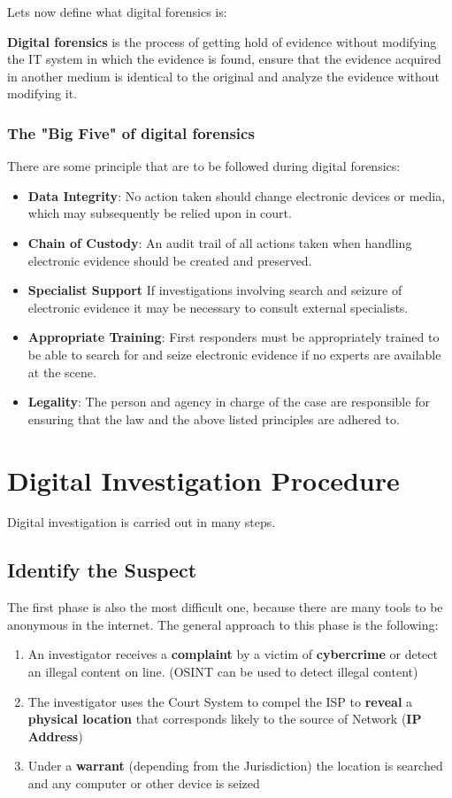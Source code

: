 Lets now define what digital forensics is:
\begin{boxH}
  \textbf{Digital forensics} is the process of getting hold of
  evidence without modifying the IT system in which the evidence is
  found, ensure that the evidence acquired in another medium is
  identical to the original and analyze the evidence without modifying 
  it.
\end{boxH}

\subsubsection{The "Big Five" of digital forensics}
There are some principle that are to be followed during digital
forensics:
\begin{itemize}
  \item \textbf{Data Integrity}: No action taken should change
    electronic devices or media, which may subsequently be relied upon
    in court. 
  \item \textbf{Chain of Custody}: An audit trail of all actions taken
    when handling electronic evidence should be created and preserved. 
  \item \textbf{Specialist Support} If investigations involving search
    and seizure of electronic evidence it may be necessary to consult
    external specialists. 
  \item \textbf{Appropriate Training}: First responders must be
    appropriately trained to be able to search for and seize
    electronic evidence if no experts are available at the scene. 
  \item \textbf{Legality}: The person and agency in charge of the case
    are responsible for ensuring that the law and the above listed
    principles are adhered to. 
\end{itemize}

\section{Digital Investigation Procedure}
Digital investigation is carried out in many steps.
\subsection{Identify the Suspect}
The first phase is also the most difficult one, because there are many
tools to be anonymous in the internet.
The general approach to this phase is the following:
\begin{enumerate}
  \item An investigator receives a \textbf{complaint} by a victim of
    \textbf{cybercrime} or detect an illegal content on line. (OSINT
    can be used to detect illegal content)
  \item The investigator uses the Court System to compel the ISP to
    \textbf{reveal} a \textbf{physical location} that corresponds
    likely to the source of Network (\textbf{IP Address})
  \item Under a \textbf{warrant} (depending from the Jurisdiction) the location
    is searched and any computer or other device is seized
\end{enumerate}

